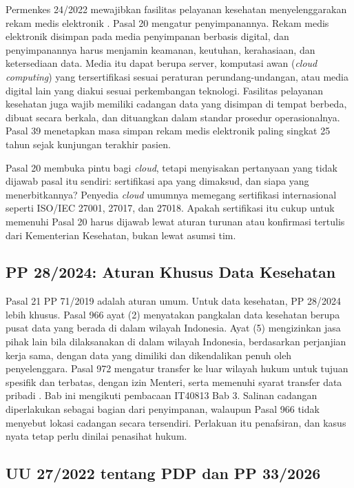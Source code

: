 Permenkes 24/2022 mewajibkan fasilitas pelayanan kesehatan menyelenggarakan rekam medis
elektronik \cite{permenkes24-2022}. Pasal 20 mengatur penyimpanannya. Rekam medis
elektronik disimpan pada media penyimpanan berbasis digital, dan penyimpanannya harus
menjamin keamanan, keutuhan, kerahasiaan, dan ketersediaan data. Media itu dapat berupa
server, komputasi awan (\textit{cloud computing}) yang tersertifikasi sesuai peraturan
perundang-undangan, atau media digital lain yang diakui sesuai perkembangan teknologi.
Fasilitas pelayanan kesehatan juga wajib memiliki cadangan data yang disimpan di tempat
berbeda, dibuat secara berkala, dan dituangkan dalam standar prosedur operasionalnya. Pasal
39 menetapkan masa simpan rekam medis elektronik paling singkat 25 tahun sejak kunjungan
terakhir pasien.

Pasal 20 membuka pintu bagi \textit{cloud}, tetapi menyisakan pertanyaan yang tidak
dijawab pasal itu sendiri: sertifikasi apa yang dimaksud, dan siapa yang menerbitkannya?
Penyedia \textit{cloud} umumnya memegang sertifikasi internasional seperti ISO/IEC 27001,
27017, dan 27018. Apakah sertifikasi itu cukup untuk memenuhi Pasal 20 harus dijawab lewat
aturan turunan atau konfirmasi tertulis dari Kementerian Kesehatan, bukan lewat asumsi tim.

\subsection*{PP 28/2024: Aturan Khusus Data Kesehatan}

Pasal 21 PP 71/2019 adalah aturan umum. Untuk data kesehatan, PP 28/2024 lebih khusus. Pasal 966
ayat (2) menyatakan pangkalan data kesehatan berupa pusat data yang berada di dalam wilayah
Indonesia. Ayat (5) mengizinkan jasa pihak lain bila dilaksanakan di dalam wilayah Indonesia,
berdasarkan perjanjian kerja sama, dengan data yang dimiliki dan dikendalikan penuh oleh
penyelenggara. Pasal 972 mengatur transfer ke luar wilayah hukum untuk tujuan spesifik dan
terbatas, dengan izin Menteri, serta memenuhi syarat transfer data pribadi
\cite{pp28-2024-kesehatan}. Bab ini mengikuti pembacaan IT40813 Bab 3. Salinan cadangan
diperlakukan sebagai bagian dari penyimpanan, walaupun Pasal 966 tidak menyebut lokasi cadangan
secara tersendiri. Perlakuan itu penafsiran, dan kasus nyata tetap perlu dinilai penasihat hukum.

\subsection*{UU 27/2022 tentang PDP dan PP 33/2026}

